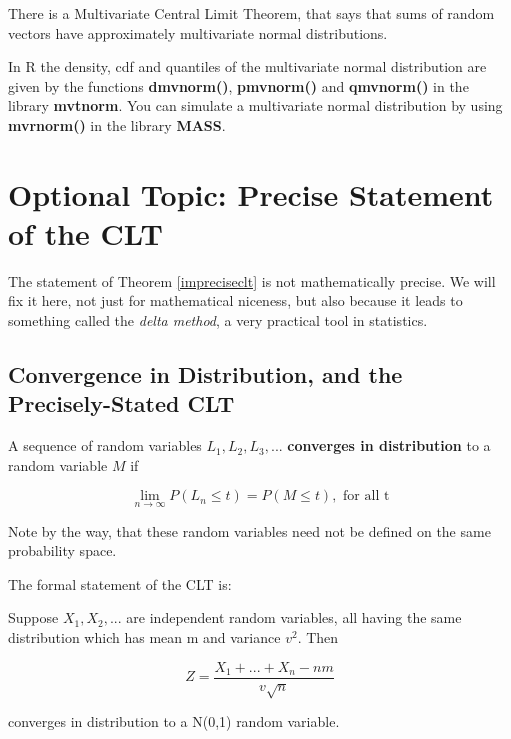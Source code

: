 There is a Multivariate Central Limit Theorem, that says that sums of
random vectors have approximately multivariate normal distributions.

In R the density, cdf and quantiles of the multivariate normal
distribution are given by the functions {\bf dmvnorm()}, {\bf pmvnorm()} 
and {\bf qmvnorm()} in the library {\bf mvtnorm}.  You can simulate a
multivariate normal distribution by using {\bf mvrnorm()} in the library
{\bf MASS}.

\section{Optional Topic:  Precise Statement of the CLT}
\label{formalclt}

The statement of Theorem \ref{impreciseclt} is not mathematically precise.
We will fix it here, not just for mathematical niceness, but also
because it leads to something called the {\it delta method}, a very
practical tool in statistics.

\subsection{Convergence in Distribution, and the Precisely-Stated CLT}

\begin{definition}
A sequence of random variables $L_1, L_2, L_3,...$ {\bf converges in
distribution} to a random variable $M$ if

\begin{equation}
\lim_{n \rightarrow \infty} P(L_n \leq t) = P(M \leq t), \textrm{ for
all t}
\end{equation}
\end{definition}

Note by the way, that these random variables need not be defined on the
same probability space.

The formal statement of the CLT is:

\begin{theorem}
Suppose $X_1, X_2, ...$ are independent random variables, all having the
same distribution which has mean m and variance $v^2$.  Then

\begin{equation}
\label{cltquant}
Z = 
\frac
{X_1+...+X_n -n m}
{v \sqrt{n}}
\end{equation}

converges in distribution to a N(0,1) random variable.  

\end{theorem}

